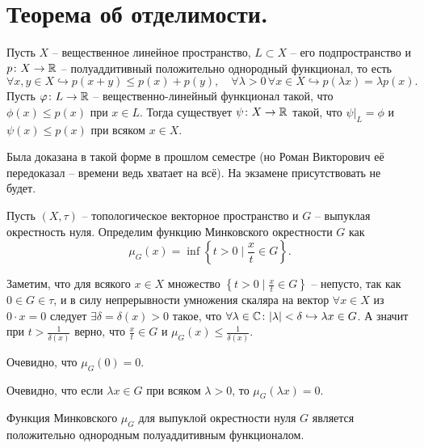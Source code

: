 \section{Теорема об отделимости.}
\begin{theorem}
    Пусть $X$ -- вещественное линейное пространство, $L \subset X$ -- его подпространство и $p\colon X \to \mathbb{R}$ -- полуаддитивный положительно однородный функционал, то есть
    \[
        \forall x, y \in X \hookrightarrow p(x + y) \leq p(x) + p(y), \quad \forall \lambda > 0\, \forall x \in X \hookrightarrow p(\lambda x) = \lambda p(x).
    \]
    Пусть $\varphi\colon L \to \mathbb{R}$ -- вещественно-линейный функционал такой, что $\phi(x) \leq p(x)$ при $x \in L$.
    Тогда существует $\psi\colon X \to \mathbb{R}$ такой, что $\psi|_L = \phi$ и $\psi(x) \leq p(x)$ при всяком $x \in X$.
\end{theorem}
\begin{notet}
    Была доказана в такой форме в прошлом семестре (но Роман Викторович её передоказал -- времени ведь хватает на всё).
    На экзамене присутствовать не будет.
\end{notet}
\begin{definition}\label{def:minkovsky}
    Пусть $(X, \tau)$ -- топологическое векторное пространство и $G$ -- выпуклая окрестность нуля.
    Определим функцию Минковского окрестности $G$ как
    \[
        \mu_G(x) = \inf\left\{t > 0 \mid \frac{x}{t} \in G\right\}.
    \]

    Заметим, что для всякого $x \in X$ множество $\left\{t > 0 \mid \frac{x}{t} \in G\right\}$ -- непусто, так как $0 \in G \in \tau$,
    и в силу непрерывности умножения скаляра на вектор $\forall x \in X$ из $0 \cdot x = 0$ следует $\exists \delta = \delta(x) > 0$ такое, что $\forall \lambda \in \mathbb{C}\colon |\lambda| < \delta \hookrightarrow \lambda x \in G$.
    А значит при $t > \frac{1}{\delta(x)}$ верно, что $\frac{x}{t} \in G$ и $\mu_G(x) \leq \frac{1}{\delta(x)}$.
\end{definition}
\begin{note}
    Очевидно, что $\mu_G(0) = 0$.
\end{note}
\begin{note}
    Очевидно, что если $\lambda x \in G$ при всяком $\lambda > 0$, то $\mu_G(\lambda x) = 0$.
\end{note}
\begin{proposition}\label{prop:minkovsky_good}
    Функция Минковского $\mu_G$ для выпуклой окрестности нуля $G$ является положительно однородным полуаддитивным функционалом.
\end{proposition}
